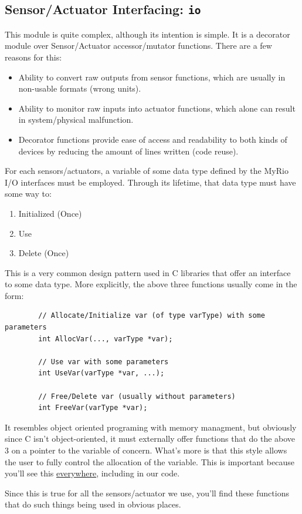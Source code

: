 \documentclass[letterpaper]{article}
\begin{document}
\subsection{Sensor/Actuator Interfacing: \texttt{io}} \label{subsection-io}
This module is quite complex, although its intention is simple. It is a decorator module over Sensor/Actuator accessor/mutator functions. There are a few reasons for this:
\begin{itemize}
    \item Ability to convert raw outputs from sensor functions, which are usually in non-usable formats (wrong units).
    \item Ability to monitor raw inputs into actuator functions, which alone can result in system/physical malfunction.
    \item Decorator functions provide ease of access and readability to both kinds of devices by reducing the amount of lines written (code reuse).
\end{itemize}
For each sensors/actuators, a variable of some data type defined by the MyRio I/O interfaces must be employed. Through its lifetime, that data type must have some way to:
\begin{enumerate}
    \item Initialized (Once)
    \item Use
    \item Delete (Once)
\end{enumerate}
\begin{tcolorbox}[colback=yellow!10, colframe=green!20!black!70, title=C-Style Usage]
    This is a very common design pattern used in C libraries that offer an interface to some data type. More explicitly, the above three functions usually come in the form:
    \begin{lstlisting}
        // Allocate/Initialize var (of type varType) with some parameters
        int AllocVar(..., varType *var);
        
        // Use var with some parameters
        int UseVar(varType *var, ...);
        
        // Free/Delete var (usually without parameters)
        int FreeVar(varType *var);
    \end{lstlisting}
    It resembles object oriented programing with memory managment, but obviously since C isn't object-oriented, it must externally offer functions that do the above 3 on a pointer to the variable of concern. What's more is that this style allows the user to fully control the allocation of the variable. This is important because you'll see this \underline{everywhere}, including in our code.
\end{tcolorbox}
Since this is true for all the sensors/actuator we use, you'll find these functions that do such things being used in obvious places. 
\end{document}
